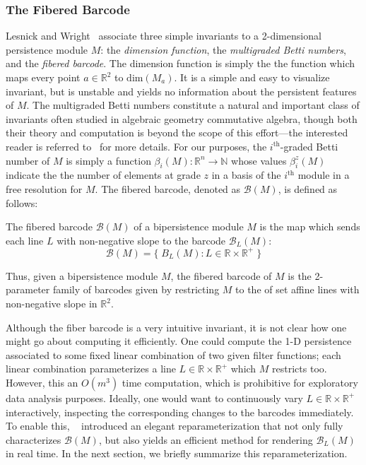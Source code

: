 \documentclass{siamart190516}
\begin{document}
\subsubsection*{The Fibered Barcode}
Lesnick and Wright~\cite{lesnick2015interactive} associate three simple invariants to a 2-dimensional persistence module $M$: the \emph{dimension function}, the \emph{multigraded Betti numbers}, and the \emph{fibered barcode}. 
The dimension function is simply the the function which maps every point $a \in \mathbb{R}^2$ to $\mathrm{dim}(M_a)$. It is a simple and easy to visualize invariant, but is unstable and yields no information about the persistent features of $M$. 
The multigraded Betti numbers constitute a natural and important class of invariants often studied in algebraic geometry commutative algebra, though both their theory and computation is beyond the scope of this effort---the interested reader is referred to~\cite{lesnick2015interactive, carlsson2009theory} for more details. For our purposes, the $i^{\text{th}}$-graded Betti number of $M$ is simply a function $\beta_i(M): \mathbb{R}^n \to \mathbb{N}$ whose values $\beta_i^z(M)$ indicate the the number of elements at grade $z$ in a basis of the $i^{\text{th}}$ module in a free resolution for $M$. 
The fibered barcode, denoted as $\mathcal{B}(M)$, is defined as follows: 
\begin{definition}
	The fibered barcode $\mathcal{B}(M)$ of a bipersistence module $M$ is the map which sends each line $L$ with non-negative slope to the barcode $\mathcal{B}_L(M)$: 
$$ \mathcal{B}(M) = \{ \; B_L(M) : L \in \mathbb{R} \times \mathbb{R}^{+} \; \}$$
\end{definition} 
\noindent Thus, given a bipersistence module $M$, the fibered barcode of $M$ is the 2-parameter family of barcodes given by restricting $M$ to the of set affine lines with non-negative slope in $\mathbb{R}^2$. 

Although the fiber barcode is a very intuitive invariant, it is not clear how one might go about computing it efficiently. One could compute the 1-D persistence associated to some fixed linear combination of two given filter functions; each linear combination parameterizes a line $L \in \mathbb{R} \times \mathbb{R}^{+}$ which $M$ restricts too. However, this an $O(m^3)$ time computation, which is prohibitive for exploratory data analysis purposes. Ideally, one would want to continuously vary $L \in \mathbb{R} \times \mathbb{R}^{+}$ interactively, inspecting the corresponding changes to the barcodes immediately. To enable this, ~\cite{lesnick2015interactive} introduced an elegant reparameterization that not only fully characterizes $\mathcal{B}(M)$, but also yields an efficient method for rendering $\mathcal{B}_L(M)$ in real time. In the next section, we briefly summarize this reparameterization. 
\end{document}
